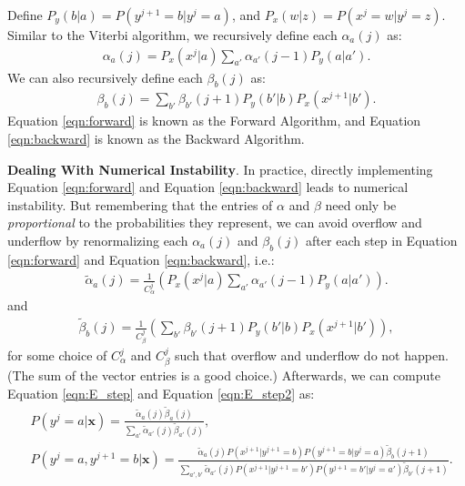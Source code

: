 \documentclass{article}
\newcommand{\alphat}{\tilde{\alpha}}
\newcommand{\betat}{\tilde{\beta}}
\newcommand{\x}{\textbf{x}}
\newcommand{\T}{\top}
\begin{document}
Define $P_y(b|a) = P(y^{j+1}=b|y^j=a)$, and $P_x(w|z) = P(x^j=w|y^j=z)$. Similar to the Viterbi algorithm, we recursively define each $\alpha_a(j)$ as:
\begin{eqnarray}\alpha_a(j) = P_x(x^j|a)\sum_{a'} \alpha_{a'}(j - 1)P_y(a|a').\label{eqn:forward}\end{eqnarray}
We can also recursively define each $\beta_b(j)$ as:
\begin{eqnarray}\beta_b(j) = \sum_{b'} \beta_{b'}(j + 1)P_y(b'|b)P_x(x^{j+1}|b').\label{eqn:backward}\end{eqnarray}
Equation \ref{eqn:forward} is known as the Forward Algorithm, and Equation \ref{eqn:backward} is known as the Backward Algorithm.

\textbf{Dealing With Numerical Instability}.  In practice, directly implementing Equation \ref{eqn:forward} and Equation \ref{eqn:backward} leads to numerical instability.  But remembering that the entries of $\alpha$ and $\beta$ need only be \emph{proportional} to the probabilities they represent, we can avoid overflow and underflow by renormalizing each $\alpha_a(j)$ and $\beta_b(j)$ after each step in Equation \ref{eqn:forward} and Equation \ref{eqn:backward}, i.e.:
\begin{eqnarray}\alphat_a(j) = \frac{1}{C^j_\alpha}\left( P_x(x^j|a)\sum_{a'} \alpha_{a'}(j - 1)P_y(a|a')\right).\label{eqn:forward3}\end{eqnarray}
and
\begin{eqnarray}\betat_b(j) = \frac{1}{C^j_\beta}\left(\sum_{b'} \beta_{b'}(j + 1)P_y(b'|b)P_x(x^{j+1}|b')\right),\label{eqn:backward3}\end{eqnarray}
for some choice of $C^j_\alpha$ and $C^j_\beta$ such that overflow and underflow do not happen.  (The sum of the vector entries is a good choice.)  Afterwards, we can compute Equation \ref{eqn:E_step} and Equation \ref{eqn:E_step2} as:
\begin{eqnarray}
&P(y^j=a | \x) = \frac{\alphat_a(j)\betat_a(j)}{\sum_{a'} \alphat_{a'}(j)\betat_{a'}(j)},\\
&P(y^j=a,y^{j+1}=b | \x) = \frac{\alphat_a(j)P(x^{j+1}|y^{j+1}=b)P(y^{j+1}=b|y^j=a)\betat_b(j + 1)}{\sum_{a',b'}\alphat_{a'}(j)P(x^{j+1}|y^{j+1}=b')P(y^{j+1}=b'|y^j=a')\betat_{b'}(j + 1)}.
\end{eqnarray}
\end{document}
